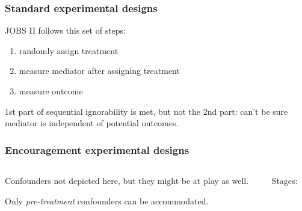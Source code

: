 \documentclass[11pt,english,dvipsnames,aspectratio=169,handout]{beamer}\usepackage[]{graphicx}\usepackage[]{xcolor}
\begin{document}
\begin{frame}
	\frametitle{Standard experimental designs}
	JOBS II follows this set of steps:
	
	\begin{enumerate}
		\item randomly assign treatment
		\item measure mediator after assigning treatment
		\item measure outcome
	\end{enumerate}\bigskip
	\pause
	
	1st part of sequential ignorability is met, but not the 2nd part: can't be sure mediator is independent of potential outcomes.
	
\end{frame}


\begin{frame}
	\frametitle{Encouragement experimental designs}
	
	\begin{columns}
		\begin{column}{0.45\textwidth}
			\begin{figure}
				\label{fig:06}
			\end{figure}
			\footnotesize
			Confounders not depicted here, but they might be at play as well.\bigskip
			\pause
			
			Only \textit{pre-treatment} confounders can be accommodated.
		\end{column}
		\pause
		\begin{column}{0.55\textwidth}
			\footnotesize
				
			Stages:
			

\end{column}
\end{columns}
\end{frame}
\end{document}
